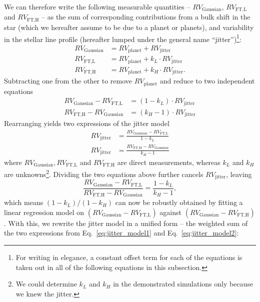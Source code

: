We can therefore write the following measurable quantities -- $RV_\text{Gaussian}$, $RV_\text{FT,L}$ and $RV_\text{FT,H}$ --
as the sum of corresponding contributions from a bulk shift in the star (which we hereafter assume to be due to a planet or planets), and variability in the stellar line profile (hereafter lumped under the general name ``jitter'')\footnote{For writing in elegance, a constant offset term for each of the equations is taken out in all of the following equations in this subsection.}:
\begin{align}
	RV_\text{Gaussian} 	&= RV_\text{planet} + RV_\text{jitter}				 \label{eq:RV_Gau} \\
	RV_\text{FT,L} 		&= RV_\text{planet} + k_L \cdot RV_\text{jitter} 		 \label{eq:RV_FTL} \\
	RV_\text{FT,H} 		&= RV_\text{planet} + k_H \cdot RV_\text{jitter}.		 \label{eq:RV_FTH}
\end{align}
Subtracting one from the other to remove $RV_\text{planet}$ and reduce to two independent equations
\begin{align}
	RV_\text{Gaussian} - RV_\text{FT,L} 	&= (1-k_L) \cdot RV_\text{jitter}\\
	RV_\text{FT,H} - RV_\text{Gaussian}	&= (k_H-1) \cdot RV_\text{jitter}
\end{align}
Rearranging yields two expressions of the jitter model
\begin{align}
	RV_\text{jitter} &= \frac{RV_\text{Gaussian} - RV_\text{FT,L}}{1-k_L} 	\label{eq:jitter_model1} \\
	RV_\text{jitter} &= \frac{RV_\text{FT,H} - RV_\text{Gaussian}}{k_H-1}		\label{eq:jitter_model2} 
\end{align}
where $RV_\text{Gaussian}, RV_\text{FT,L}$ and $RV_\text{FT,H}$ are direct measurements, whereas $k_L$ and $k_H$ are unknowns\footnote{We could determine $k_L$ and $k_H$ in the demonstrated simulations only because we knew the jitter.}. Dividing the two equations above further cancels $RV_\text{jitter}$, leaving 
\begin{equation}
	\frac{RV_\text{Gaussian}-RV_\text{FT,L}}{RV_\text{FT,H} - RV_\text{Gaussian}} = \frac{1-k_L}{k_H-1},
\end{equation}
which means $(1-k_L)/(1-k_H)$ can now be robustly obtained by fitting a linear regression model on $(RV_\text{Gaussian}-RV_\text{FT,L})$ against $(RV_\text{Gaussian} - RV_\text{FT,H})$. With this, we rewrite the jitter model in a unified form -- the weighted sum of the two expressions from Eq.~\ref{eq:jitter_model1} and Eq.~\ref{eq:jitter_model2}: 
